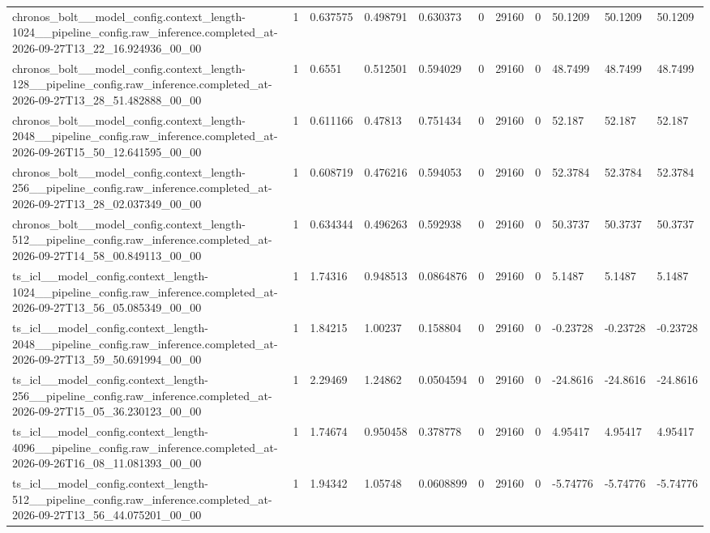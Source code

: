 \begin{tabular}{lllllllllll}
chronos\_bolt\_\_model\_config.context\_length-1024\_\_pipeline\_config.raw\_inference.completed\_at-2026-09-27T13\_22\_16.924936\_00\_00 & 1 & 0.637575 & 0.498791 & 0.630373 & 0 & 29160 & 0 & 50.1209 & 50.1209 & 50.1209 \\
chronos\_bolt\_\_model\_config.context\_length-128\_\_pipeline\_config.raw\_inference.completed\_at-2026-09-27T13\_28\_51.482888\_00\_00 & 1 & 0.6551 & 0.512501 & 0.594029 & 0 & 29160 & 0 & 48.7499 & 48.7499 & 48.7499 \\
chronos\_bolt\_\_model\_config.context\_length-2048\_\_pipeline\_config.raw\_inference.completed\_at-2026-09-26T15\_50\_12.641595\_00\_00 & 1 & 0.611166 & 0.47813 & 0.751434 & 0 & 29160 & 0 & 52.187 & 52.187 & 52.187 \\
chronos\_bolt\_\_model\_config.context\_length-256\_\_pipeline\_config.raw\_inference.completed\_at-2026-09-27T13\_28\_02.037349\_00\_00 & 1 & 0.608719 & 0.476216 & 0.594053 & 0 & 29160 & 0 & 52.3784 & 52.3784 & 52.3784 \\
chronos\_bolt\_\_model\_config.context\_length-512\_\_pipeline\_config.raw\_inference.completed\_at-2026-09-27T14\_58\_00.849113\_00\_00 & 1 & 0.634344 & 0.496263 & 0.592938 & 0 & 29160 & 0 & 50.3737 & 50.3737 & 50.3737 \\
ts\_icl\_\_model\_config.context\_length-1024\_\_pipeline\_config.raw\_inference.completed\_at-2026-09-27T13\_56\_05.085349\_00\_00 & 1 & 1.74316 & 0.948513 & 0.0864876 & 0 & 29160 & 0 & 5.1487 & 5.1487 & 5.1487 \\
ts\_icl\_\_model\_config.context\_length-2048\_\_pipeline\_config.raw\_inference.completed\_at-2026-09-27T13\_59\_50.691994\_00\_00 & 1 & 1.84215 & 1.00237 & 0.158804 & 0 & 29160 & 0 & -0.23728 & -0.23728 & -0.23728 \\
ts\_icl\_\_model\_config.context\_length-256\_\_pipeline\_config.raw\_inference.completed\_at-2026-09-27T15\_05\_36.230123\_00\_00 & 1 & 2.29469 & 1.24862 & 0.0504594 & 0 & 29160 & 0 & -24.8616 & -24.8616 & -24.8616 \\
ts\_icl\_\_model\_config.context\_length-4096\_\_pipeline\_config.raw\_inference.completed\_at-2026-09-26T16\_08\_11.081393\_00\_00 & 1 & 1.74674 & 0.950458 & 0.378778 & 0 & 29160 & 0 & 4.95417 & 4.95417 & 4.95417 \\
ts\_icl\_\_model\_config.context\_length-512\_\_pipeline\_config.raw\_inference.completed\_at-2026-09-27T13\_56\_44.075201\_00\_00 & 1 & 1.94342 & 1.05748 & 0.0608899 & 0 & 29160 & 0 & -5.74776 & -5.74776 & -5.74776 \\

\end{tabular}
